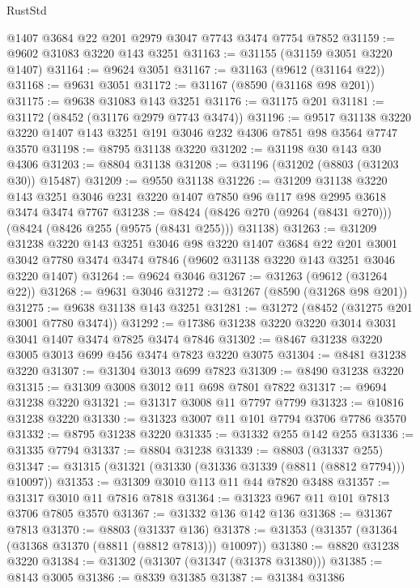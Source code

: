 \begin{lexlean}{RustStd}
\begin{coremodule}
    @1407
    @3684
    @22
    @201
    @2979
    @3047
    @7743
    @3474
    @7754
    @7852
@31159 := @9602 @31083 @3220 @143 @3251
@31163 := @31155 (@31159 @3051 @3220 @1407)
@31164 := @9624 @3051
@31167 := @31163 (@9612 (@31164 @22))
@31168 := @9631 @3051
@31172 := @31167 (@8590 (@31168 @98 @201))
@31175 := @9638 @31083 @143 @3251
@31176 := @31175 @201
@31181 := @31172 (@8452 (@31176 @2979 @7743 @3474))
@31196 := @9517
    @31138
    @3220
    @3220
    @1407
    @143
    @3251
    @191
    @3046
    @232
    @4306
    @7851
    @98
    @3564
    @7747
    @3570
@31198 := @8795 @31138 @3220
@31202 := @31198 @30 @143 @30 @4306
@31203 := @8804 @31138
@31208 := @31196 (@31202 (@8803 (@31203 @30)) @15487)
@31209 := @9550 @31138
@31226 := @31209
    @31138
    @3220
    @143
    @3251
    @3046
    @231
    @3220
    @1407
    @7850
    @96
    @117
    @98
    @2995
    @3618
    @3474
    @3474
    @7767
@31238 := @8424 (@8426 @270 (@9264 (@8431 @270))) (@8424 (@8426 @255 (@9575 (@8431 @255))) @31138)
@31263 := @31209
    @31238
    @3220
    @143
    @3251
    @3046
    @98
    @3220
    @1407
    @3684
    @22
    @201
    @3001
    @3042
    @7780
    @3474
    @3474
    @7846
    (@9602 @31138 @3220 @143 @3251 @3046 @3220 @1407)
@31264 := @9624 @3046
@31267 := @31263 (@9612 (@31264 @22))
@31268 := @9631 @3046
@31272 := @31267 (@8590 (@31268 @98 @201))
@31275 := @9638 @31138 @143 @3251
@31281 := @31272 (@8452 (@31275 @201 @3001 @7780 @3474))
@31292 := @17386 @31238 @3220 @3220 @3014 @3031 @3041 @1407 @3474 @7825 @3474 @7846
@31302 := @8467 @31238 @3220 @3005 @3013 @699 @456 @3474 @7823 @3220 @3075
@31304 := @8481 @31238 @3220
@31307 := @31304 @3013 @699 @7823
@31309 := @8490 @31238 @3220
@31315 := @31309 @3008 @3012 @11 @698 @7801 @7822
@31317 := @9694 @31238 @3220
@31321 := @31317 @3008 @11 @7797 @7799
@31323 := @10816 @31238 @3220
@31330 := @31323 @3007 @11 @101 @7794 @3706 @7786 @3570
@31332 := @8795 @31238 @3220
@31335 := @31332 @255 @142 @255
@31336 := @31335 @7794
@31337 := @8804 @31238
@31339 := @8803 (@31337 @255)
@31347 := @31315 (@31321 (@31330 (@31336 @31339 (@8811 (@8812 @7794))) @10097))
@31353 := @31309 @3010 @113 @11 @44 @7820 @3488
@31357 := @31317 @3010 @11 @7816 @7818
@31364 := @31323 @967 @11 @101 @7813 @3706 @7805 @3570
@31367 := @31332 @136 @142 @136
@31368 := @31367 @7813
@31370 := @8803 (@31337 @136)
@31378 := @31353 (@31357 (@31364 (@31368 @31370 (@8811 (@8812 @7813))) @10097))
@31380 := @8820 @31238 @3220
@31384 := @31302 (@31307 (@31347 (@31378 @31380)))
@31385 := @8143 @3005
@31386 := @8339 @31385
@31387 := @31384 @31386

\end{coremodule}
\end{lexlean}
